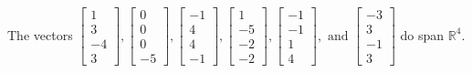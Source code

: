 \begin{exercise}
\begin{exerciseStatement}
  \end{exerciseStatement}
  \begin{exerciseAnswer}
   The vectors \(\left[\begin{array}{r}
1 \\
3 \\
-4 \\
3
\end{array}\right] , \left[\begin{array}{r}
0 \\
0 \\
0 \\
-5
\end{array}\right] , \left[\begin{array}{r}
-1 \\
4 \\
4 \\
-1
\end{array}\right] , \left[\begin{array}{r}
1 \\
-5 \\
-2 \\
-2
\end{array}\right] , \left[\begin{array}{r}
-1 \\
-1 \\
1 \\
4
\end{array}\right] , \text{ and } \left[\begin{array}{r}
-3 \\
3 \\
-1 \\
3
\end{array}\right]\) 
  	 do  
	span \(\mathbb{R}^4\).
  


  \end{exerciseAnswer}
\end{exercise}